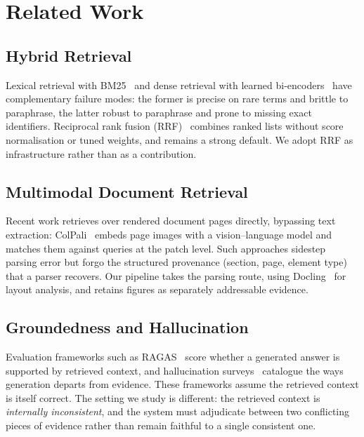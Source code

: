 \documentclass[conference]{IEEEtran}
\newif\ifdraftmode
\newcommand{\TODO}[1]{\ifdraftmode\textcolor{red}{\textbf{[TODO: #1]}}\fi}
\begin{document}
\section{Related Work}

\subsection{Hybrid Retrieval}
Lexical retrieval with BM25~\cite{robertson2009bm25} and dense retrieval with
learned bi-encoders~\cite{karpukhin2020dpr} have complementary failure modes:
the former is precise on rare terms and brittle to paraphrase, the latter
robust to paraphrase and prone to missing exact identifiers. Reciprocal rank
fusion (RRF)~\cite{cormack2009rrf} combines ranked lists without score
normalisation or tuned weights, and remains a strong default. We adopt RRF as
infrastructure rather than as a contribution.

\subsection{Multimodal Document Retrieval}
Recent work retrieves over rendered document pages directly, bypassing text
extraction: ColPali~\cite{faysse2024colpali} embeds page images with a
vision--language model and matches them against queries at the patch level.
Such approaches sidestep parsing error but forgo the structured provenance
(section, page, element type) that a parser recovers. Our pipeline takes the
parsing route, using Docling~\cite{docling2024} for layout analysis, and
retains figures as separately addressable evidence.
\TODO{Position against page-level retrieval explicitly --- a reviewer will ask
why you parse instead of embedding pages. The honest answer is provenance and
per-element citation; make sure that is argued, not asserted.}

\subsection{Groundedness and Hallucination}
Evaluation frameworks such as RAGAS~\cite{es2023ragas} score whether a
generated answer is supported by retrieved context, and hallucination
surveys~\cite{ji2023hallucination} catalogue the ways generation departs from
evidence. These frameworks assume the retrieved context is itself correct. The
setting we study is different: the retrieved context is
\emph{internally inconsistent}, and the system must adjudicate between two
conflicting pieces of evidence rather than remain faithful to a single
consistent one.
\TODO{Search for prior work on chart--caption factual consistency and on
scientific claim verification against figures; if a close neighbour exists,
this subsection must engage it directly rather than claim novelty.}
\end{document}

